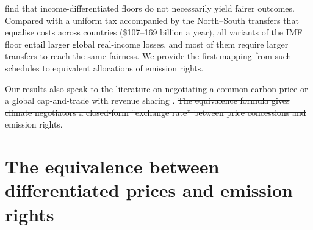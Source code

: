 \documentclass[12pt,english]{article}
\theoremstyle{remark}
\providecommand{\DIFdeltex}[1]{{\protect\color{red}\sout{#1}}}                      %
\providecommand{\DIFdelbegin}{} %
\providecommand{\DIFdelend}{} %
\providecommand{\DIFdel}[1]{\texorpdfstring{\DIFdeltex{#1}}{}} %
\newcommand{\DIFscaledelfig}{0.5}
\newlength{\DIFdelgraphicswidth} %
\newlength{\DIFdelgraphicsheight} %
\newcommand{\DIFdelincludegraphics}[2][]{%
\sbox{\DIFdelgraphicsbox}{\DIFOincludegraphics[#1]{#2}}%
\settoboxwidth{\DIFdelgraphicswidth}{\DIFdelgraphicsbox} %
\settoboxtotalheight{\DIFdelgraphicsheight}{\DIFdelgraphicsbox} %
\scalebox{\DIFscaledelfig}{%
\parbox[b]{\DIFdelgraphicswidth}{\usebox{\DIFdelgraphicsbox}\\[-\baselineskip] \rule{\DIFdelgraphicswidth}{0em}}\llap{\resizebox{\DIFdelgraphicswidth}{\DIFdelgraphicsheight}{%
\setlength{\unitlength}{\DIFdelgraphicswidth}%
\begin{picture}(1,1)%
\thicklines\linethickness{2pt} %
{\color[rgb]{1,0,0}\put(0,0){\framebox(1,1){}}}%
{\color[rgb]{1,0,0}\put(0,0){\line( 1,1){1}}}%
{\color[rgb]{1,0,0}\put(0,1){\line(1,-1){1}}}%
\end{picture}%
}\hspace*{3pt}}} %
} %
\DeclareRobustCommand{\DIFdelbegin}{\DIFOdelbegin \let\includegraphics\DIFdelincludegraphics} %
\DeclareRobustCommand{\DIFdelend}{\DIFOaddend \let\includegraphics\DIFOincludegraphics} %
\begin{document}
\citet{le_moigne_distributional_2026} find that income-differentiated floors do not necessarily yield fairer outcomes. Compared with a uniform tax accompanied by the North--South transfers that equalise costs across countries (\$107--169 billion a year), all variants of the IMF floor entail larger global real-income losses, and most of them require larger transfers to reach the same fairness. We provide the first mapping from such schedules to equivalent allocations of emission rights. %

Our results also speak to the literature on negotiating a common carbon price or a global cap-and-trade with revenue sharing \citep{grubb_greenhouse_1990,weitzman_can_2014,gollier_negotiating_2015,cramton_global_2017,nordhaus_climate_2015,fabre_global_2024}.
\DIFdelbegin \DIFdel{The equivalence formula gives climate negotiators a closed-form ``exchange rate'' between price concessions and emission rights.
}%

\DIFdelend %
\section{The equivalence between differentiated prices and emission rights}
\label{sec:theory}
\end{document}
